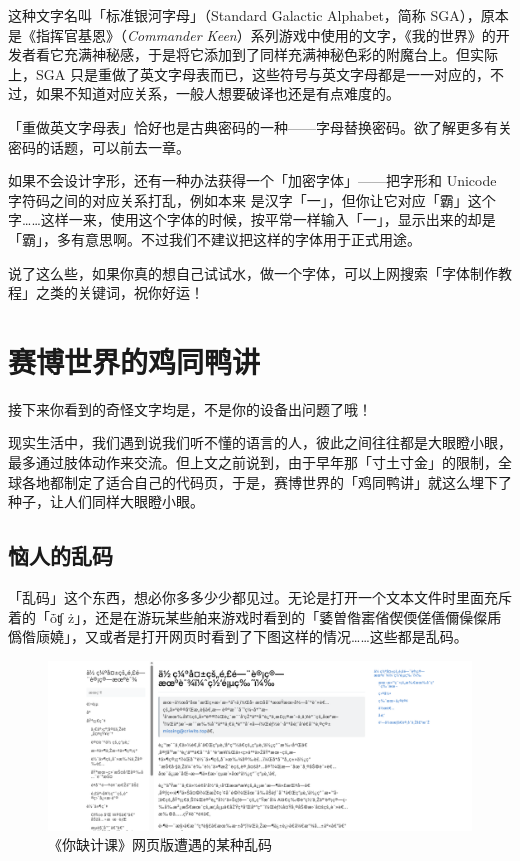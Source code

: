 这种文字名叫「标准银河字母」（Standard Galactic Alphabet，简称 SGA），原本是《指挥官基恩》（\textit{Commander Keen}）系列游戏中使用的文字，《我的世界》的开发者看它充满神秘感，于是将它添加到了同样充满神秘色彩的附魔台上。但实际上，SGA 只是重做了英文字母表而已，这些符号与英文字母都是一一对应的，不过，如果不知道对应关系，一般人想要破译也还是有点难度的。

\begin{note}
  「重做英文字母表」恰好也是古典密码的一种——字母替换密码。欲了解更多有关密码的话题，可以前去一章。
\end{note}

如果不会设计字形，还有一种办法获得一个「加密字体」——把字形和 Unicode 字符码之间的对应关系打乱，例如本来  是汉字「一」，但你让它对应「霸」这个字……这样一来，使用这个字体的时候，按平常一样输入「一」，显示出来的却是「霸」，多有意思啊。不过我们不建议把这样的字体用于正式用途。

说了这么些，如果你真的想自己试试水，做一个字体，可以上网搜索「字体制作教程」之类的关键词，祝你好运！

\section{赛博世界的鸡同鸭讲}

\begin{warning}
  接下来你看到的奇怪文字均是，不是你的设备出问题了哦！
\end{warning}

现实生活中，我们遇到说我们听不懂的语言的人，彼此之间往往都是大眼瞪小眼，最多通过肢体动作来交流。但上文之前说到，由于早年那「寸土寸金」的限制，全球各地都制定了适合自己的代码页，于是，赛博世界的「鸡同鸭讲」就这么埋下了种子，让人们同样大眼瞪小眼。

\subsection{恼人的乱码}

「乱码」这个东西，想必你多多少少都见过。无论是打开一个文本文件时里面充斥着的「\replacesymb\replacesymb{}ȱʧ\replacesymb\replacesymb\replacesymb\replacesymb{} \replacesymb{}ż\replacesymb\replacesymb\replacesymb\replacesymb\replacesymb\replacesymb」，还是在游玩某些舶来游戏时看到的「婱曽偺寚偗偰偄傞僐儞僺儏乕僞偺庼嬈」，又或者是打开网页时看到了下图这样的情况……这些都是乱码。

\begin{figure}[htb!]
  \centering
  \includegraphics[width=.98\textwidth]{assets/advanced/MissingButWindows1252.png}
  \caption{《你缺计课》网页版遭遇的某种乱码}
  \label{fig:MissingButWindows1252}
\end{figure}


